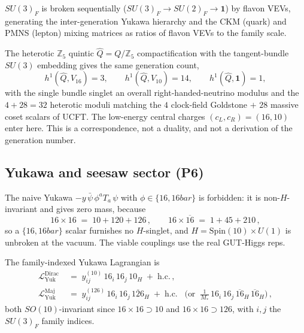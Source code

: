 \begin{postulate}\label{post:sm:flavons}
$SU(3)_F$ is broken sequentially ($SU(3)_F\to SU(2)_F\to \mathbf{1}$) by flavon VEVs,
generating the inter-generation Yukawa hierarchy and the CKM (quark) and PMNS (lepton)
mixing matrices as ratios of flavon VEVs to the family scale.
\end{postulate}

\begin{indicative}\label{ind:sm:heterotic}
The heterotic $\mathbb{Z}_5$ quintic $\hat Q=Q/\mathbb{Z}_5$ compactification with the
tangent-bundle $SU(3)$ embedding gives the same generation count,
\begin{equation}\label{eq:sm:het}
h^1(\hat Q,V_{16})=3,\qquad h^1(\hat Q,V_{10})=14,\qquad h^1(\hat Q,\mathbf{1})=1,
\end{equation}
with the single bundle singlet an overall right-handed-neutrino modulus and the
$4+28=32$ heterotic moduli matching the $4$ clock-field Goldstone $+$ $28$ massive
coset scalars of UCFT. The low-energy central charges $(c_L,c_R)=(16,10)$ enter here.
This is a correspondence, not a duality, and not a derivation of the generation number.
\end{indicative}

\subsection{Yukawa and seesaw sector (P6)}
\label{sec:sm:yukawa}

\begin{theorem}\label{thm:sm:noyukawa}
The naive Yukawa $-y\,\bar\psi\,\phi^a T_a\,\psi$ with $\phi\in\{16,16bar\}$ is
forbidden: it is non-$H$-invariant and gives zero mass, because
\begin{equation}\label{eq:sm:tensor}
16\times 16 \;=\; 10+120+126\,,
\qquad
16\times \overline{16} \;=\; 1+45+210\,,
\end{equation}
so a $\{16,16bar\}$ scalar furnishes no $H$-singlet, and $H=\mathrm{Spin}(10)\times
U(1)$ is unbroken at the vacuum. The viable couplings use the real GUT-Higgs reps.
\end{theorem}

\begin{postulate}\label{post:sm:P6yukawa}
The family-indexed Yukawa Lagrangian is
\begin{align}
\mathcal{L}^{\mathrm{Dirac}}_{\mathrm{Yuk}}
 &\;=\; y^{(10)}_{ij}\,16_i\,16_j\,10_H \;+\; \mathrm{h.c.}\,,
 \label{eq:sm:Ldirac}\\
\mathcal{L}^{\mathrm{Maj}}_{\mathrm{Yuk}}
 &\;=\; y^{(126)}_{ij}\,16_i\,16_j\,\overline{126}_H \;+\; \mathrm{h.c.}
 \;\;\;\Big(\text{or}\;\; \tfrac{1}{M_*}\,16_i\,16_j\,\overline{16}_H\,\overline{16}_H\Big)\,,
 \label{eq:sm:Lmaj}
\end{align}
both $SO(10)$-invariant since $16\times 16\supset 10$ and $16\times 16\supset 126$,
with $i,j$ the $SU(3)_F$ family indices.
\end{postulate}

